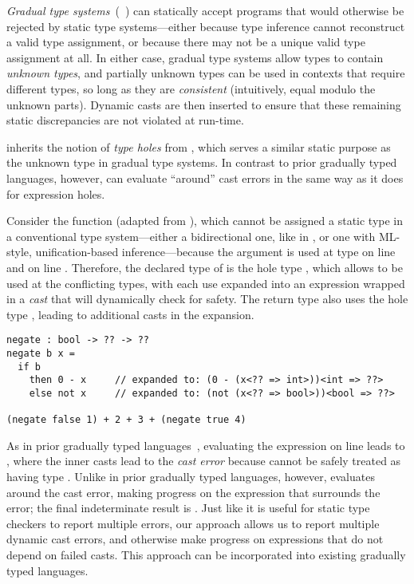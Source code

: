 \emph{Gradual type systems}~(\eg{}~\cite{XXX,XXX,XXX}) can statically accept
programs that would otherwise be rejected by static type systems---either
because type inference cannot reconstruct a valid type assignment, or because
there may not be a unique valid type assignment at all.
%
In either case, gradual type systems allow types to contain \emph{unknown
types}, and partially unknown types can be used in contexts that require
different types, so long as they are \emph{consistent} (intuitively, equal
modulo the unknown parts).
%
Dynamic casts are then inserted to ensure that these remaining static
discrepancies are not violated at run-time.

\HazelnutLive{} inherits the notion of \emph{type holes} from
\citet{popl-paper}, which serves a similar static purpose as the unknown type in
gradual type systems.
%
In contrast to prior gradually typed languages, however, \HazelnutLive{} can
evaluate ``around'' cast errors in the same way as it does for expression holes.


Consider the  function (adapted from \cite{ChughPOPL2012}), which
cannot be assigned a static type in a conventional type system---either a
bidirectional one, like in \HazelnutLive{}, or one with ML-style,
unification-based inference---because the argument  is used at type
 on line  and  on line .
%
Therefore, the declared type of  is the hole type , which allows
 to be used at the conflicting types, with each use expanded into an
expression wrapped in a \emph{cast} that will dynamically check for safety.
%
The return type also uses the hole type , leading to additional casts in
the expansion.

\begin{lstlisting}
negate : bool -> ?? -> ??
negate b x =
  if b
    then 0 - x     // expanded to: (0 - (x<?? => int>))<int => ??>
    else not x     // expanded to: (not (x<?? => bool>))<bool => ??>

(negate false 1) + 2 + 3 + (negate true 4)
\end{lstlisting}

\noindent
%
As in prior gradually typed languages~\cite{XXX},
evaluating the expression  on line  leads to
, where the inner casts
lead to the \emph{cast error}  because  cannot be
safely treated as having type .
%
Unlike in prior gradually typed languages, however, \HazelnutLive{} evaluates
around the cast error, making progress on the 
expression that surrounds the error; the final indeterminate result is
.
%
Just like it is useful for static type checkers to report multiple errors, our
approach allows us to report multiple dynamic cast errors, and otherwise make
progress on expressions that do not depend on failed casts.
%
This approach can be incorporated into existing gradually typed languages.


